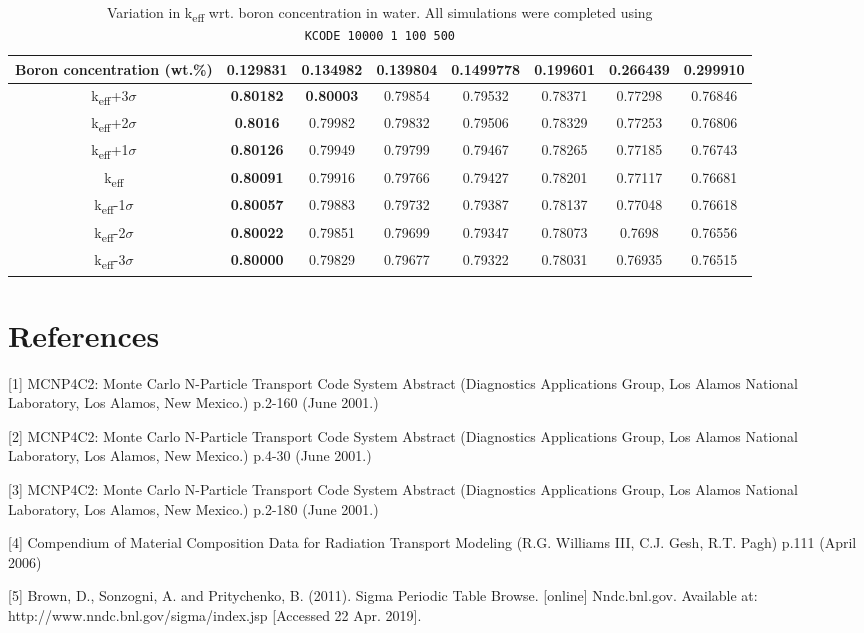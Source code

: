 \documentclass[a4paper, 11pt]{article}
\begin{document}
\begin{appendices}
\begin{table}[H]
	\centering
	\begin{tabular}{c|ccccccc} 
		Boron concentration (wt.\%) & 0.129831 & 0.134982 & 0.139804 & 0.1499778 & 0.199601 & 0.266439 & 0.299910\\
		\hline
		k\textsubscript{eff}+3$\sigma$ &\textbf{0.80182} & \textbf{0.80003} & 0.79854 & 0.79532 & 0.78371 & 0.77298 & 0.76846 \\
		k\textsubscript{eff}+2$\sigma$ &\textbf{0.8016} & 0.79982 & 0.79832 & 0.79506 & 0.78329 & 0.77253 & 0.76806 \\
		k\textsubscript{eff}+1$\sigma$ &\textbf{0.80126} & 0.79949 & 0.79799 & 0.79467 & 0.78265 & 0.77185 & 0.76743 \\
		k\textsubscript{eff}           &\textbf{0.80091} & 0.79916 & 0.79766 & 0.79427 & 0.78201 & 0.77117 & 0.76681 \\
		k\textsubscript{eff}-1$\sigma$ &\textbf{0.80057} & 0.79883 & 0.79732 & 0.79387 & 0.78137 & 0.77048 & 0.76618 \\
		k\textsubscript{eff}-2$\sigma$ &\textbf{0.80022} & 0.79851 & 0.79699 & 0.79347 & 0.78073 & 0.7698 & 0.76556 \\
		k\textsubscript{eff}-3$\sigma$ &\textbf{0.80000} & 0.79829 & 0.79677 & 0.79322 & 0.78031 & 0.76935 & 0.76515 \\
	\end{tabular}
\caption{Variation in k\textsubscript{eff} wrt. boron concentration in water. All simulations were completed using \\ \texttt{KCODE 10000 1 100 500}
}\label{kvarTab}
\end{table}
\section{References}
\indent

[1] MCNP4C2: Monte Carlo N-Particle Transport Code System Abstract (Diagnostics Applications Group, Los Alamos National Laboratory, Los Alamos, New Mexico.) p.2-160 (June 2001.)

[2] MCNP4C2: Monte Carlo N-Particle Transport Code System Abstract (Diagnostics Applications Group, Los Alamos National Laboratory, Los Alamos, New Mexico.) p.4-30 (June 2001.)

[3] MCNP4C2: Monte Carlo N-Particle Transport Code System Abstract (Diagnostics Applications Group, Los Alamos National Laboratory, Los Alamos, New Mexico.) p.2-180 (June 2001.)

[4] Compendium of Material Composition Data for Radiation Transport Modeling (R.G. Williams III, C.J. Gesh, R.T. Pagh) p.111 (April 2006)

[5] Brown, D., Sonzogni, A. and Pritychenko, B. (2011). Sigma Periodic Table Browse. [online] Nndc.bnl.gov. Available at: http://www.nndc.bnl.gov/sigma/index.jsp [Accessed 22 Apr. 2019].

\end{appendices}
\end{document}
